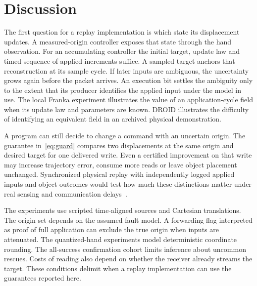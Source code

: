 \section{Discussion}
The first question for a replay implementation is which state its displacement updates. A measured-origin controller exposes that state through the hand observation. For an accumulating controller the initial target, update law and timed sequence of applied increments suffice. A sampled target anchors that reconstruction at its sample cycle. If later inputs are ambiguous, the uncertainty grows again before the packet arrives. An execution bit settles the ambiguity only to the extent that its producer identifies the applied input under the model in use. The local Franka experiment illustrates the value of an application-cycle field when its update law and parameters are known. DROID illustrates the difficulty of identifying an equivalent field in an archived physical demonstration.

A program can still decide to change a command with an uncertain origin. The guarantee in~\eqref{eq:guard} compares two displacements at the same origin and desired target for one delivered write. Even a certified improvement on that write may increase trajectory error, consume more reads or leave object placement unchanged. Synchronized physical replay with independently logged applied inputs and object outcomes would test how much these distinctions matter under real sensing and communication delays~\cite{li2025simpler}.

The experiments use scripted time-aligned sources and Cartesian translations. The origin set depends on the assumed fault model. A forwarding flag interpreted as proof of full application can exclude the true origin when inputs are attenuated. The quantized-hand experiments model deterministic coordinate rounding. The all-success confirmation cohort limits inference about uncommon rescues. Costs of reading also depend on whether the receiver already streams the target. These conditions delimit when a replay implementation can use the guarantees reported here.
